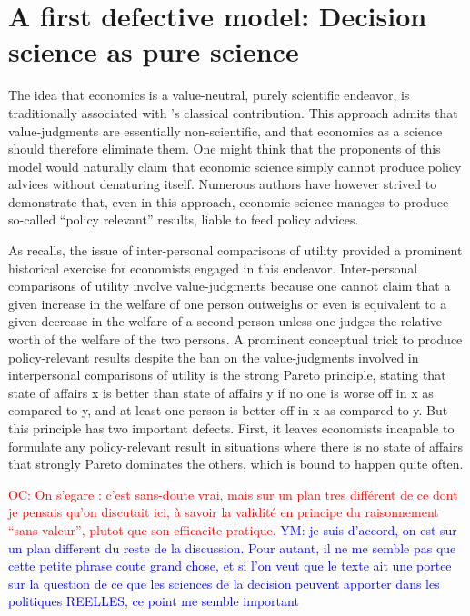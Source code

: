 \documentclass[preprint,11pt]{elsarticle}
\newcommand{\commentYM}[1]{\textcolor{blue}{YM: #1}}
\newcommand{\commentOC}[1]{\textcolor{red}{OC: #1}}
\begin{document}
\section{A first defective model: Decision science as pure science}
\noindent The idea that economics is a value-neutral, purely scientific endeavor, is traditionally associated with \cite{robbins_essay_2007}'s classical contribution. This approach admits that value-judgments are essentially non-scientific, and that economics as a science should therefore eliminate them. One might think that the proponents of this model would naturally claim that economic science simply cannot produce policy advices without denaturing itself. Numerous authors have however strived to demonstrate that, even in this approach, economic science manages to produce so-called “policy relevant” results, liable to feed policy advices.

As \cite{baujard_leconomie_2011} recalls, the issue of inter-personal comparisons of utility provided a prominent historical exercise for economists engaged in this endeavor. Inter-personal comparisons of utility involve value-judgments because one cannot claim that a given increase in the welfare of one person outweighs or even is equivalent to a given decrease in the welfare of a second person unless one judges the relative worth of the welfare of the two persons. A prominent conceptual trick to produce policy-relevant results despite the ban on the value-judgments involved in interpersonal comparisons of utility is the strong Pareto principle, stating that state of affairs x is better than state of affairs y if no one is worse off in x as compared to y, and at least one person is better off in x as compared to y. But this principle has two important defects. First, it leaves economists incapable to formulate any policy-relevant result in situations where there is no state of affairs that strongly Pareto dominates the others, which is bound to happen quite often. 

\commentOC{ On s'egare : c'est sans-doute vrai,
mais sur un plan tres différent de ce dont je pensais qu'on
discutait ici, à savoir la validité en principe du raisonnement
``sans valeur'', plutot que son efficacite pratique.}
\commentYM{je suis d'accord, on est sur un plan different du reste de la discussion. Pour autant, il ne me semble pas que cette petite phrase coute grand chose, et si l'on veut que le texte ait une portee sur la question de ce que les sciences de la decision peuvent apporter dans les politiques REELLES, ce point me semble important}
\end{document}
